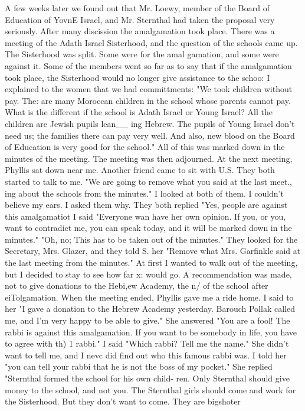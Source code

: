 A few weeks later we found out that Mr. Loewy, member of the Board of Education of YovnE 
Israel, and Mr. Sternthal had taken the proposal very seriously. After many discission 
the amalgamation took place. There was a meeting of the Adath Israel Sisterhood, and 
the question of the schools came up. The Sisterhood was split. Some were for the amal 
gamation, and some were against it. Some of the members went so far as to say that if 
the amalgamation took place, the Sisterhood would no longer give assistance to the schoo: 
I explained to the women that we had committments: "We took children without pay. The: 
are many Moroccan children in the school whose parents cannot pay. What is the different 
if the school is Adath Israel or Young Israel? All the children are Jewish pupils lean__ 
ing Hebrew. The pupils of Young Israel don't need us; the families there can pay very 
well. And also, new blood on the Board of Education is very good for the school." All 
of this was marked down in the minutes of the meeting. The meeting was then adjourned. 
At the next meeting, Phyllis sat down near me. Another friend came to sit with U.S. 
They both started to talk to me. "We are going to remove what you said at the last meet., 
ing about the schools from the minutes." I looked at both of them. I couldn't believe 
my ears. I asked them why. They both replied "Yes, people are against this amalgamatiot 
I said "Everyone wan have her own opinion. If you, or you, want to contradict me, you 
can speak today, and it will be marked down in the minutes." "Oh, no; This has to be 
taken out of the minutes." They looked for the Secretary, Mrs. Glazer, and they told 
S. 
her "Remove what Mrs. Garfinkle said at the last meeting from the minutes." 
At first I wanted to walk out of the meeting, but I decided to stay to see how far x: 
would go. A recommendation was made, not to give donations to the Hebi,ew Academy, the n/ 
of the school after eiTolgamation. When the meeting ended, Phyllis gave me a ride home. 
I said to her "I gave a donation to the Hebrew Academy yesterday. Barouch Pollak called 
me, and I'm very happy to be able to give." She answered "You are a fool! The rabbi is 
against this amalgamation. If you want to be somebody in life, you have to agree with th) 
1 
rabbi." I said "Which rabbi? Tell me the name." She didn't want to tell me, and I nevc 
did find out who this famous rabbi was. I told her "you can tell your rabbi that he is 
not the boss of my pocket." She replied "Sternthal formed the school for his own child-
ren. Only Sternthal should give money to the school, and not you. The Sternthal girls 
should come and work for the Sisterhood. But they don't want to come. They are bigshoter 